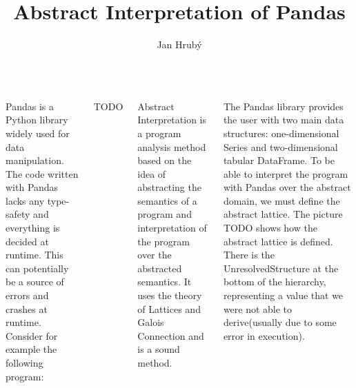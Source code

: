 \documentclass{tikzposter}
\title{Abstract Interpretation of Pandas}
\author{Jan Hrubý}
\institute{Charles University, Faculty of Mathematics and Physics}
\begin{document}
    \maketitle

    \begin{columns}


        {
            \Large
            Pandas is a Python library widely used for data manipulation. %
            The code written with Pandas lacks any type-safety and everything is decided at runtime.
            This can potentially be a source of errors and crashes at runtime.
            Consider for example the following program:
            
            TODO
        }

        {
            \Large
            Abstract Interpretation is a program analysis method based on the idea
            of abstracting the semantics of a program and interpretation of the
            program over the abstracted semantics.
            It uses the theory of Lattices and Galois Connection and is a sound method.
        }


        {
            \Large
            The Pandas library provides the user with two main data structures: one-dimensional Series
            and two-dimensional tabular DataFrame.
            To be able to interpret the program with Pandas over the abstract domain, we must define the abstract lattice.
            The picture TODO shows how the abstract lattice is defined.
            There is the UnresolvedStructure at the bottom of the hierarchy, representing a value that we were not
            able to derive(usually due to some error in execution).
        }


\end{columns}
\end{document}
